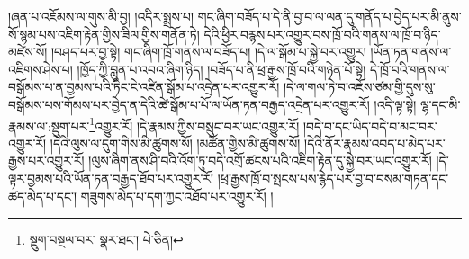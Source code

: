 །ཞན་པ་འཇོམས་ལ་གུས་མི་བྱ། །འདིར་སྨྲས་པ། གང་ཞིག་བཟོད་པ་དེ་ནི་བྱ་བ་ལ་ལན་དུ་གནོད་པ་བྱེད་པར་མི་ནུས་སོ་སྙམ་པས་འཇིག་རྟེན་གྱིས་ཟིལ་གྱིས་གནོན་ཏེ། དེའི་ཕྱིར་བརྙས་པར་འགྱུར་བས་ཁྲོ་བའི་གནས་ལ་ཁྲོ་བ་ཉིད་མཛེས་སོ། །བཤད་པར་བྱ་སྟེ། གང་ཞིག་ཁྲོ་གནས་ལ་བཟོད་པ། །དེ་ལ་སྒོམ་པ་སྐྱེ་བར་འགྱུར། །ཡོན་ཏན་གནས་ལ་འཇིགས་ཤེས་པ། །ཁྱོད་ཀྱི་བླུན་པ་འབའ་ཞིག་ཉིད། །བཟོད་པ་ནི་ཕྲ་རྒྱས་ཁྲོ་བའི་གཉེན་པོ་སྟེ། དེ་ཁྲོ་བའི་གནས་ལ་བསྒོམས་པ་ན་བྱམས་པའི་ཏིང་ངེ་འཛིན་སྒོམ་པ་འདྲེན་པར་འགྱུར་རོ། །དེ་ལ་གལ་ཏེ་བ་འཇོས་ཙམ་གྱི་དུས་སུ་བསྒོམས་པས་གོམས་པར་བྱེད་ན་དེའི་ཚེ་སྒོམ་པ་པོ་ལ་ཡོན་ཏན་བརྒྱད་འདྲེན་པར་འགྱུར་རོ། །འདི་ལྟ་སྟེ། ལྷ་དང་མི་རྣམས་ལ་:སྡུག་པར་\footnote{སྡུག་བསྔལ་བར་  སྣར་ཐང་།  པེ་ཅིན། }འགྱུར་རོ། །དེ་རྣམས་ཀྱིས་བསྲུང་བར་ཡང་འགྱུར་རོ། །བདེ་བ་དང་ཡིད་བདེ་བ་མང་བར་འགྱུར་རོ། །དེའི་ལུས་ལ་དུག་གིས་མི་ཚུགས་སོ། །མཚོན་གྱིས་མི་ཚུགས་སོ། །དེའི་ནོར་རྣམས་འབད་པ་མེད་པར་རྒྱས་པར་འགྱུར་རོ། །ལུས་ཞིག་ནས་ཤི་བའི་འོག་ཏུ་བདེ་འགྲོ་ཚངས་པའི་འཇིག་རྟེན་དུ་སྐྱེ་བར་ཡང་འགྱུར་རོ། །དེ་ལྟར་བྱམས་པའི་ཡོན་ཏན་བརྒྱད་ཐོབ་པར་འགྱུར་རོ། །ཕྲ་རྒྱས་ཁྲོ་བ་སྤངས་པས་རྙེད་པར་བྱ་བ་བསམ་གཏན་དང་ཚད་མེད་པ་དང་། གཟུགས་མེད་པ་དག་ཀྱང་འཐོབ་པར་འགྱུར་རོ། །
